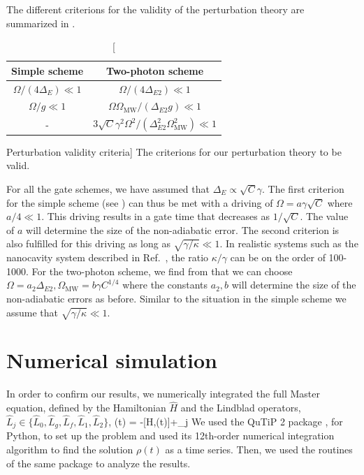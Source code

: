 The different criterions for the validity of the perturbation theory are
summarized in .
\begin{table} [H]
\centering
\begin{tabular}{|c|c|}
\hline
Simple scheme & Two-photon scheme  \\ \hline
$\Omega/(4\Delta_{E})\ll1$ & $\Omega/(4\Delta_{E2})\ll1$ \\ \hline
$\Omega/g\ll1$ & $\Omega\Omega_{\text{MW}}/(\Delta_{E2}g)\ll1$ \\ \hline
- & $3\sqrt{C}\gamma^{2}\Omega^{2}/(\Delta_{E2}^{2}\Omega_{\text{MW}}^{2})\ll1$  \\ \hline
\end{tabular}
\caption
[Perturbation validity criteria]
{The criterions for our perturbation theory to be valid. }
\label{tab:tableS1}
\end{table}
For all the gate schemes, we have assumed that
$\Delta_{E}\propto\sqrt{C}\gamma$. The first criterion for the simple scheme
(see ) can thus be met with a driving of
$\Omega=a\gamma\sqrt{C}$ where $a/4\ll1$. This driving results in a gate time
that decreases as $1/\sqrt{C}$. The value of $a$ will determine the size of the
non-adiabatic error. The second criterion is also fulfilled for this driving as
long as $\sqrt{\gamma/\kappa}\ll1$. In realistic systems such as the nanocavity
system described in Ref.~\cite{thompson, Tiecke}, the ratio $\kappa/\gamma$ can
be on the order of 100-1000.
For the two-photon scheme, we find from  that we can choose
$\Omega=a_{2}\Delta_{E2}, \Omega_{\text{MW}}=b\gamma C^{1/4}$ where the
constants $a_{2},b$ will determine the size of the non-adiabatic errors as
before. Similar to the situation in the simple scheme we assume that
$\sqrt{\gamma/\kappa}\ll1$.

\section{Numerical simulation}
\label{app:Numerical_simulations}
In order to confirm our results, we numerically integrated the full Master
equation, defined by the Hamiltonian $\hat H$ and the Lindblad operators,
$\hat L_j \in \{\hat L_0, \hat L_g, \hat L_f, \hat L_1, \hat L_2\}$, 
\bel
\label{eq:full Master eq}
	\rho(t) = -[\hat H,\rho(t)]+\sum_j 
\eel
We used the QuTiP 2
package \cite{Johansson20131234}, for Python, to set up the problem and used its
12th-order numerical integration algorithm to find the solution $\rho(t)$ as a
time series.
Then, we used the routines of the same package to analyze the results. 

